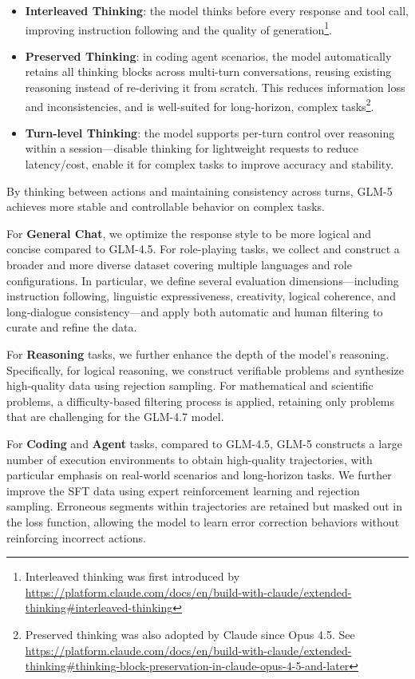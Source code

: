 \begin{itemize}[leftmargin=1.5em,itemsep=2pt]
    \item \textbf{Interleaved Thinking}: the model thinks before every response and tool call, improving instruction following and the quality of generation\footnote{Interleaved thinking was first introduced by \url{https://platform.claude.com/docs/en/build-with-claude/extended-thinking\#interleaved-thinking}}.
    \item \textbf{Preserved Thinking}: in coding agent scenarios, the model automatically retains all thinking blocks across multi-turn conversations, reusing existing reasoning instead of re-deriving it from scratch. This reduces information loss and inconsistencies, and is well-suited for long-horizon, complex tasks\footnote{Preserved thinking was also adopted by Claude since Opus 4.5. See \url{https://platform.claude.com/docs/en/build-with-claude/extended-thinking\#thinking-block-preservation-in-claude-opus-4-5-and-later}}.
    \item \textbf{Turn-level Thinking}: the model supports per-turn control over reasoning within a session—disable thinking for lightweight requests to reduce latency/cost, enable it for complex tasks to improve accuracy and stability.
\end{itemize}

By thinking between actions and maintaining consistency across turns, GLM-5 achieves more stable and controllable behavior on complex tasks.

For \textbf{General Chat}, we optimize the response style to be more logical and concise compared to GLM-4.5. For role-playing tasks, we collect and construct a broader and more diverse dataset covering multiple languages and role configurations. In particular, we define several evaluation dimensions---including instruction following, linguistic expressiveness, creativity, logical coherence, and long-dialogue consistency---and apply both automatic and human filtering to curate and refine the data.

For \textbf{Reasoning} tasks, we further enhance the depth of the model's reasoning. Specifically, for logical reasoning, we construct verifiable problems and synthesize high-quality data using rejection sampling. For mathematical and scientific problems, a difficulty-based filtering process is applied, retaining only problems that are challenging for the GLM-4.7 model.

For \textbf{Coding} and \textbf{Agent} tasks, compared to GLM-4.5, GLM-5 constructs a large number of execution environments to obtain high-quality trajectories, with particular emphasis on real-world scenarios and long-horizon tasks. We further improve the SFT data using expert reinforcement learning and rejection sampling. Erroneous segments within trajectories are retained but masked out in the loss function, allowing the model to learn error correction behaviors without reinforcing incorrect actions.

